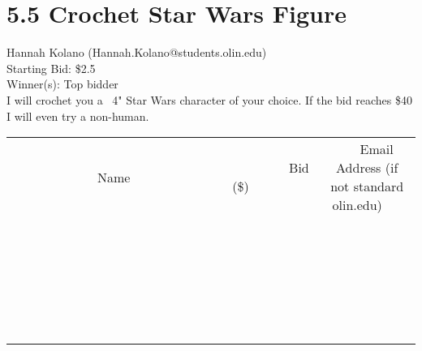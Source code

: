 \documentclass[11pt]{article}
\begin{document}
					\section*{5.5 Crochet Star Wars Figure}
					Hannah Kolano (Hannah.Kolano@students.olin.edu) \\
					Starting Bid: \$2.5 \\
					Winner(s): Top bidder \\
					I will crochet you a ~4" Star Wars character of your choice. If the bid reaches \$40 I will even try a non-human. \\
					[6ex]
					\begin{tabular}{c c c}
						~~~~~~~~~~~~~Name~~~~~~~~~~~~~ & ~~~~~~~~~Bid (\$)~~~~~~~~~ & ~~~Email Address (if not standard olin.edu)~~~ \\
				
 & & \\
\hline
 & & \\
\hline
 & & \\
\hline
 & & \\
\hline
 & & \\
\hline
 & & \\
\hline
 & & \\
\hline
 & & \\
\hline
 & & \\
\hline
 & & \\
\hline
 & & \\
\hline
 & & \\
\hline
 & & \\
\hline
 & & \\
\hline
 & & \\
\hline
 & & \\
\hline
 & & \\
\hline
 & & \\
\hline
 & & \\
\hline
 & & \\
\hline
 & & \\
\hline
 & & \\
\hline
 & & \\
\hline
 & & \\
\hline
 & & \\
\hline
 & & \\
\hline
					\end{tabular}
					\clearpage
				
\end{document}
